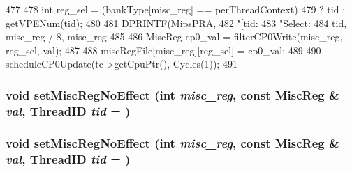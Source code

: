 \begin{DoxyCode}
477 {
478     int reg_sel = (bankType[misc_reg] == perThreadContext)
479         ? tid : getVPENum(tid);
480 
481     DPRINTF(MipsPRA,
482             "[tid:%
483             "Select:%
484             tid, misc_reg / 8, misc_reg %
485 
486     MiscReg cp0_val = filterCP0Write(misc_reg, reg_sel, val);
487 
488     miscRegFile[misc_reg][reg_sel] = cp0_val;
489 
490     scheduleCP0Update(tc->getCpuPtr(), Cycles(1));
491 }
\end{DoxyCode}
\hypertarget{classMipsISA_1_1ISA_ab8dd4afdd4e652ca191b235505691f68}{
\subsubsection[{setMiscRegNoEffect}]{\setlength{\rightskip}{0pt plus 5cm}void setMiscRegNoEffect (int {\em misc\_\-reg}, \/  const {\bf MiscReg} \& {\em val}, \/  {\bf ThreadID} {\em tid} = {})}}
\label{classMipsISA_1_1ISA_ab8dd4afdd4e652ca191b235505691f68}
\hypertarget{classMipsISA_1_1ISA_ab8dd4afdd4e652ca191b235505691f68}{
\subsubsection[{setMiscRegNoEffect}]{\setlength{\rightskip}{0pt plus 5cm}void setMiscRegNoEffect (int {\em misc\_\-reg}, \/  const {\bf MiscReg} \& {\em val}, \/  {\bf ThreadID} {\em tid} = {})}}
\label{classMipsISA_1_1ISA_ab8dd4afdd4e652ca191b235505691f68}



